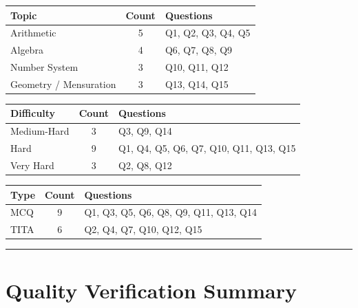 \documentclass[11pt,a4paper]{article}
\begin{document}
\begin{center}
\begin{tabular}{|l|c|l|}
\hline
\textbf{Topic} & \textbf{Count} & \textbf{Questions} \\
\hline
Arithmetic & 5 & Q1, Q2, Q3, Q4, Q5 \\
Algebra & 4 & Q6, Q7, Q8, Q9 \\
Number System & 3 & Q10, Q11, Q12 \\
Geometry / Mensuration & 3 & Q13, Q14, Q15 \\
\hline
\end{tabular}
\end{center}

\vspace{0.5em}

\begin{center}
\begin{tabular}{|l|c|l|}
\hline
\textbf{Difficulty} & \textbf{Count} & \textbf{Questions} \\
\hline
Medium-Hard & 3 & Q3, Q9, Q14 \\
Hard & 9 & Q1, Q4, Q5, Q6, Q7, Q10, Q11, Q13, Q15 \\
Very Hard & 3 & Q2, Q8, Q12 \\
\hline
\end{tabular}
\end{center}

\vspace{0.5em}

\begin{center}
\begin{tabular}{|l|c|l|}
\hline
\textbf{Type} & \textbf{Count} & \textbf{Questions} \\
\hline
MCQ & 9 & Q1, Q3, Q5, Q6, Q8, Q9, Q11, Q13, Q14 \\
TITA & 6 & Q2, Q4, Q7, Q10, Q12, Q15 \\
\hline
\end{tabular}
\end{center}

\vspace{0.5em}
\hrule
\vspace{0.5em}

\section*{Quality Verification Summary}
\end{document}
